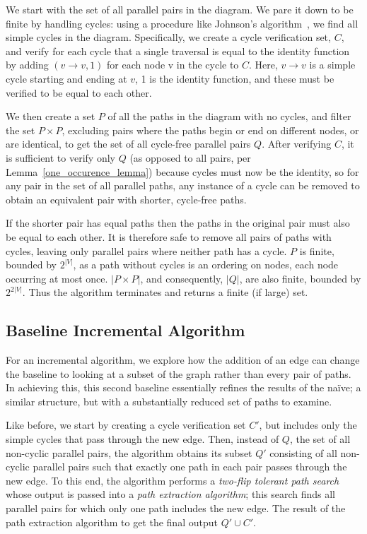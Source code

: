 \documentclass[sigplan,review]{acmart}
\begin{document}
We start with the set of all parallel pairs in the diagram.
We pare it down to be finite by handling cycles: using a procedure like Johnson's algorithm~\cite{johnson}, we find all simple cycles in the diagram.
Specifically, we create a cycle verification set, $C$, and verify for each cycle that a single traversal is equal to the identity function by adding $(v \rightarrow v, 1)$ for each node v in the cycle to $C$.
Here, $v \rightarrow v$ is a simple cycle starting and ending at $v$, 1 is the identity function, and these must be verified to be equal to each other.

We then create a set $P$ of all the paths in the diagram with no cycles, and filter the set $P \times P$, excluding pairs where the paths begin or end on different nodes, or are identical, to get the set of all cycle-free parallel pairs $Q$.
After verifying $C$, it is sufficient to verify only $Q$ (as opposed to all pairs, per Lemma~\ref{one_occurence_lemma}) because cycles must now be the identity, so for any pair in the set of all parallel paths, any instance of a cycle can be removed to obtain an equivalent pair with shorter, cycle-free paths.

If the shorter pair has equal paths then the paths in the original pair must also be equal to each other.
It is therefore safe to remove all pairs of paths with cycles, leaving only parallel pairs where neither path has a cycle.
$P$ is finite, bounded by $2^{|V|}$, as a path without cycles is an ordering on nodes, each node occurring at most once.
$|P \times P|$, and consequently, $|Q|$, are also finite, bounded by $2^{2|V|}$.
Thus the algorithm terminates and returns a finite (if large) set.

\subsection{Baseline Incremental Algorithm}

For an incremental algorithm, we explore how the addition of an edge can change the baseline to looking at a subset of the graph rather than every pair of paths.  In achieving this, this second baseline essentially refines the results of the na\"{i}ve; a similar structure, but with a substantially reduced set of paths to examine.

Like before, we start by creating a cycle verification set $C'$, but includes only the simple cycles that pass through the new edge.
Then, instead of $Q$, the set of all non-cyclic parallel pairs, the algorithm obtains its subset $Q'$ consisting of all non-cyclic parallel pairs such that exactly one path in each pair passes through the new edge.
To this end, the algorithm performs a \textit{two-flip tolerant path search} whose output is passed into a \textit{path extraction algorithm}; this search finds all parallel pairs for which only one path includes the new edge.
The result of the path extraction algorithm to get the final output $Q' \cup C'$.
\end{document}
